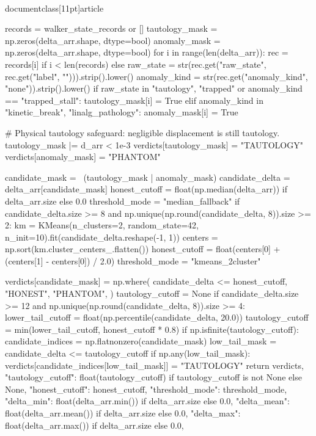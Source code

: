\\documentclass[11pt]{article}
\begin{document}
\begin{CodeBlock}
    records = walker_state_records or []
    tautology_mask = np.zeros(delta_arr.shape, dtype=bool)
    anomaly_mask = np.zeros(delta_arr.shape, dtype=bool)
    for i in range(len(delta_arr)):
        rec = records[i] if i < len(records) else {}
        raw_state = str(rec.get("raw_state", rec.get("label", ""))).strip().lower()
        anomaly_kind = str(rec.get("anomaly_kind", "none")).strip().lower()
        if raw_state in {"tautology", "trapped"} or anomaly_kind == "trapped_stall":
            tautology_mask[i] = True
        elif anomaly_kind in {"kinetic_break", "linalg_pathology"}:
            anomaly_mask[i] = True

    # Physical tautology safeguard: negligible displacement is still tautology.
    tautology_mask |= d_arr < 1e-3
    verdicts[tautology_mask] = "TAUTOLOGY"
    verdicts[anomaly_mask] = "PHANTOM"

    candidate_mask = ~(tautology_mask | anomaly_mask)
    candidate_delta = delta_arr[candidate_mask]
    honest_cutoff = float(np.median(delta_arr)) if delta_arr.size else 0.0
    threshold_mode = "median_fallback"
    if candidate_delta.size >= 8 and np.unique(np.round(candidate_delta, 8)).size >= 2:
        km = KMeans(n_clusters=2, random_state=42, n_init=10).fit(candidate_delta.reshape(-1, 1))
        centers = np.sort(km.cluster_centers_.flatten())
        honest_cutoff = float(centers[0] + (centers[1] - centers[0]) / 2.0)
        threshold_mode = "kmeans_2cluster"

    verdicts[candidate_mask] = np.where(
        candidate_delta <= honest_cutoff,
        "HONEST",
        "PHANTOM",
    )
    tautology_cutoff = None
    if candidate_delta.size >= 12 and np.unique(np.round(candidate_delta, 8)).size >= 4:
        lower_tail_cutoff = float(np.percentile(candidate_delta, 20.0))
        tautology_cutoff = min(lower_tail_cutoff, honest_cutoff * 0.8)
        if np.isfinite(tautology_cutoff):
            candidate_indices = np.flatnonzero(candidate_mask)
            low_tail_mask = candidate_delta <= tautology_cutoff
            if np.any(low_tail_mask):
                verdicts[candidate_indices[low_tail_mask]] = "TAUTOLOGY"
    return verdicts, {
        "tautology_cutoff": float(tautology_cutoff) if tautology_cutoff is not None else None,
        "honest_cutoff": honest_cutoff,
        "threshold_mode": threshold_mode,
        "delta_min": float(delta_arr.min()) if delta_arr.size else 0.0,
        "delta_mean": float(delta_arr.mean()) if delta_arr.size else 0.0,
        "delta_max": float(delta_arr.max()) if delta_arr.size else 0.0,
    }



\end{CodeBlock}
\end{document}
